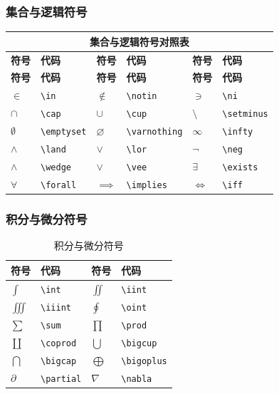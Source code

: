 \documentclass{article}
\begin{document}
\subsubsection{集合与逻辑符号}
\begin{longtable}{|p{1.5cm}|p{2cm}|p{1.5cm}|p{2cm}|p{1.5cm}|p{2cm}|}
\hline
\multicolumn{6}{|c|}{\textbf{集合与逻辑符号对照表}} \\
\hline
\textbf{符号} & \textbf{代码} & \textbf{符号} & \textbf{代码} & \textbf{符号} & \textbf{代码} \\
\hline
\endfirsthead
\hline
\textbf{符号} & \textbf{代码} & \textbf{符号} & \textbf{代码} & \textbf{符号} & \textbf{代码} \\
\hline
\endhead
$\in$ & \verb|\in| & $\notin$ & \verb|\notin| & $\ni$ & \verb|\ni| \\
$\cap$ & \verb|\cap| & $\cup$ & \verb|\cup| & $\setminus$ & \verb|\setminus| \\
$\emptyset$ & \verb|\emptyset| & $\varnothing$ & \verb|\varnothing| & $\infty$ & \verb|\infty| \\
$\land$ & \verb|\land| & $\lor$ & \verb|\lor| & $\neg$ & \verb|\neg| \\
$\wedge$ & \verb|\wedge| & $\vee$ & \verb|\vee| & $\exists$ & \verb|\exists| \\
$\forall$ & \verb|\forall| & $\implies$ & \verb|\implies| & $\iff$ & \verb|\iff| \\
\hline
\end{longtable}

\subsubsection{积分与微分符号}
\begin{table}[H]
\centering
\begin{tabular}{>{\centering\arraybackslash}p{2cm}>{\centering\arraybackslash}p{3cm}>{\centering\arraybackslash}p{2cm}>{\centering\arraybackslash}p{3cm}}
\toprule
\textbf{符号} & \textbf{代码} & \textbf{符号} & \textbf{代码} \\
\midrule
$\int$ & \verb|\int| & $\iint$ & \verb|\iint| \\
$\iiint$ & \verb|\iiint| & $\oint$ & \verb|\oint| \\
$\sum$ & \verb|\sum| & $\prod$ & \verb|\prod| \\
$\coprod$ & \verb|\coprod| & $\bigcup$ & \verb|\bigcup| \\
$\bigcap$ & \verb|\bigcap| & $\bigoplus$ & \verb|\bigoplus| \\
$\partial$ & \verb|\partial| & $\nabla$ & \verb|\nabla| \\
\bottomrule
\end{tabular}
\caption{积分与微分符号}
\end{table}
\end{document}

